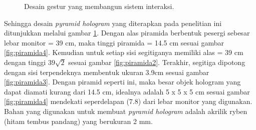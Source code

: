 			\begin{figure} [H]
				\hspace{0.1em}
				\hspace{0.1em}
				\caption{Desain gestur yang membangun sistem interaksi.}
				\label{fig:desainpiramida}
			\end{figure}
			\vspace{-2ex}
		
			Sehingga desain \textit{pyramid hologram} yang diterapkan pada penelitian ini ditunjukkan melalui gambar \ref{fig:desainpiramida}. Dengan alas piramida berbentuk pesergi sebesar lebar monitor = 39 cm, maka tinggi piramida = 14.5 cm sesuai gambar \ref{fig:piramida4}. Kemudian untuk setiap sisi segitiganya memiliki alas = 39 cm dengan tinggi $39\sqrt{2}$ sesuai gambar \ref{fig:piramida2}. Terakhir, segitiga dipotong dengan sisi terpendeknya membentuk ukuran 3.9cm sesuai gambar \ref{fig:piramida3}. Dengan piramid seperti ini, maka besar objek hologram yang dapat diamati kurang dari 14.5 cm, idealnya adalah 5 x 5 x 5 cm sesuai gambar \ref{fig:piramida4} mendekati seperdelapan (7.8) dari lebar monitor yang digunakan. Bahan yang digunakan untuk membuat \textit{pyramid hologram} adalah akrilik ryben (hitam tembus pandang) yang berukuran 2 mm.
	\vspace{1.5ex}
	
